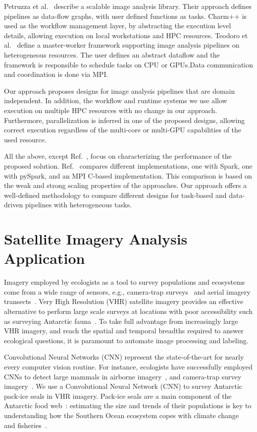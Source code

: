 Petruzza et al.~\cite{petruzza2017isavs} describe a scalable image analysis
library. Their approach defines pipelines as data-flow graphs, with user
defined functions as tasks. Charm++ is used as the workflow management layer,
by abstracting the execution level details, allowing execution on local
workstations and HPC resources. Teodoro et
al.~\cite{teodoro2013highthroughput} define a master-worker framework
supporting image analysis pipelines on heterogeneous resources. The user
defines an abstract dataflow and the framework is responsible to schedule
tasks on CPU or GPUs.Data communication and coordination is done via MPI.

Our approach proposes designs for image analysis pipelines that are domain
independent. In addition, the workflow and runtime systems we use allow
execution on multiple HPC resources with no change in our approach.
Furthermore, parallelization is inferred in one of the proposed designs,
allowing correct execution regardless of the multi-core or multi-GPU
capabilities of the used resource.

All the above, except Ref.~\cite{zhang2016kira}, focus on characterizing the
performance of the proposed solution. Ref.~\cite{zhang2016kira} compares
different implementations, one with Spark, one with pySpark, and an MPI
C-based implementation. This comparison is based on the weak and strong
scaling properties of the approaches. Our approach offers a well-defined
methodology to compare different designs for task-based and data-driven
pipelines with heterogeneous tasks.


\section{Satellite Imagery Analysis Application}
\label{sec:ucase}

Imagery employed by ecologists as a tool to survey populations and ecosystems
come from a wide range of sensors, e.g., camera-trap
surveys~\cite{karanth1995estimating} and aerial imagery
transects~\cite{western2009impact}. Very High Resolution (VHR) satellite
imagery provides an effective alternative to perform large scale surveys at
locations with poor accessibility such as surveying Antarctic
fauna~\cite{lynch2012detection}. To take full advantage from increasingly
large VHR imagery, and reach the spatial and temporal breadths required to
answer ecological questions, it is paramount to automate image processing and
labeling.

Convolutional Neural Networks (CNN) represent the state-of-the-art for nearly
every computer vision routine. For instance, ecologists have successfully
employed CNNs to detect large mammals in airborne
imagery~\cite{kellenberger2018detecting,polzounov2016right}, and camera-trap
survey imagery~\cite{norouzzadeh2018automatically}. We use a Convolutional
Neural Network (CNN) to survey Antarctic pack-ice seals in VHR imagery.
Pack-ice seals are a main component of the Antarctic food
web~\cite{fabra2008convention}: estimating the size and trends of their
populations is key to understanding how the Southern Ocean ecosystem copes
with climate change~\cite{hillebrand2018climate} and
fisheries~\cite{reid2019climate}.

